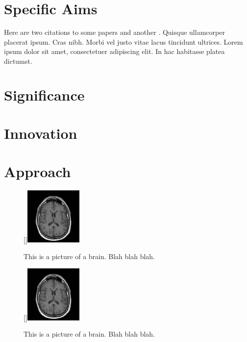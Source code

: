 \documentclass[11pt,letterpaper]{article}
\begin{document}
\section*{Specific Aims}

Here are two citations to some papers
\cite{HODGKIN:1952aa,HODGKIN:1952ab,Hodgkin:1947aa} and another
\cite{Hodgkin:1990aa}. Quisque ullamcorper placerat ipsum. Cras
nibh. Morbi vel justo vitae lacus tincidunt ultrices. Lorem ipsum
dolor sit amet, consectetuer adipiscing elit. In hac habitasse platea
dictumst.

\lipsum[1-7]

\newpage

\section*{Significance}

\lipsum[1-9]

\section*{Innovation}

\lipsum[1-5]

\section*{Approach}

\lipsum[1]

\begin{figure}
  \centering
  \raisebox{0pt}[\dimexpr{}\baselineskip\relax]{\includegraphics[width=0.25\textwidth]{figures/t1_brain.jpg}}
  \caption{This is a picture of a brain. Blah blah blah.}
  \label{fig:brain}
\end{figure}

\lipsum[10-13]

\begin{figure}
  \centering
  \raisebox{0pt}[\dimexpr{}\baselineskip\relax]{\includegraphics[width=0.25\textwidth]{figures/t1_brain.jpg}}
  \caption{This is a picture of a brain. Blah blah blah.}
  \label{fig:brain2}
\end{figure}

\lipsum[14-17]

\newpage
\clearpage

\end{document}
